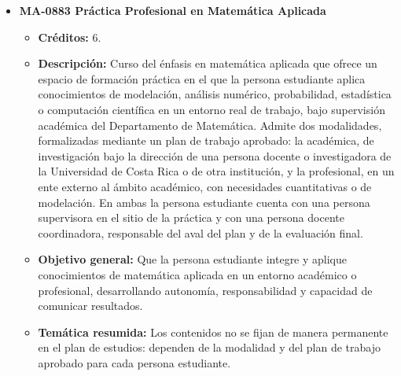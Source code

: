 \begin{itemize}[leftmargin=1.3em, itemsep=10pt, topsep=4pt, label={\color{Azul-UCR}$\blacksquare$}]
\item {\color{Azul-UCR}\textbf{MA-0883 Práctica Profesional en Matemática Aplicada}}\par\nopagebreak\smallskip
\begin{itemize}[leftmargin=1.1em, itemsep=3pt, topsep=2pt, parsep=2pt, label={\textendash}]
\item \textbf{Créditos:} 6.
\item \textbf{Descripción:} Curso del énfasis en matemática aplicada que ofrece un espacio de formación práctica en el que la persona estudiante aplica conocimientos de modelación, análisis numérico, probabilidad, estadística o computación científica en un entorno real de trabajo, bajo supervisión académica del Departamento de Matemática. Admite dos modalidades, formalizadas mediante un plan de trabajo aprobado: la académica, de investigación bajo la dirección de una persona docente o investigadora de la Universidad de Costa Rica o de otra institución, y la profesional, en un ente externo al ámbito académico, con necesidades cuantitativas o de modelación. En ambas la persona estudiante cuenta con una persona supervisora en el sitio de la práctica y con una persona docente coordinadora, responsable del aval del plan y de la evaluación final.
\item \textbf{Objetivo general:} Que la persona estudiante integre y aplique conocimientos de matemática aplicada en un entorno académico o profesional, desarrollando autonomía, responsabilidad y capacidad de comunicar resultados.
\item \textbf{Temática resumida:} Los contenidos no se fijan de manera permanente en el plan de estudios: dependen de la modalidad y del plan de trabajo aprobado para cada persona estudiante.
\end{itemize}


\end{itemize}
